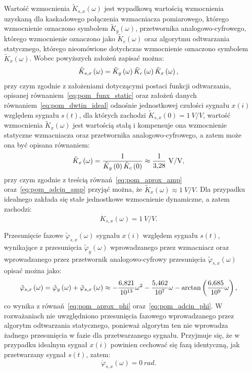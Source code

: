 Wartość wzmocnienia $\tilde{K}_{s,x}(\omega)$ jest wypadkową wartością wzmocnienia uzyskaną dla kaskadowego połączenia wzmacniacza pomiarowego, którego wzmocnienie oznaczono symbolem $\tilde{K}_{y}(\omega)$, przetwornika analogowo-cyfrowego, którego wzmocnienie oznaczono jako $\tilde{K}_{c}(\omega)$ oraz algorytmu odtwarzania statycznego, którego nieomówione dotychczas wzmocnienie oznaczono symbolem $\tilde{K}_{x}(\omega)$. Wobec powyższych założeń zapisać można:
\begin{equation}
\tilde{K}_{s,x} \left(\omega\right) = \tilde{K}_{y} \left(\omega\right) \tilde{K}_{c} \left(\omega\right) \tilde{K}_{x} \left(\omega\right) \label{eq:pom_dwtin_amp},
\end{equation}
przy czym zgodnie z założeniami dotyczącymi postaci funkcji odtwarzania, opisanej równaniem~\eqref{eq:pom_funx_static} oraz założeń danych równaniem~\eqref{eq:pom_dwtin_ideal} odnośnie jednostkowej czułości sygnału $x(i)$ względem sygnału $s(t)$, dla których zachodzi $\tilde{K}_{s,x}(0) = \qty{1}{V \per V}$, wartość wzmocnienia $\tilde{K}_{x}(\omega)$ jest wartością stałą i kompensuje ona wzmocnienie statyczne wzmacniacza oraz przetwornika analogowo-cyfrowego, a zatem może ona być opisana równaniem:
\begin{equation}
\tilde{K}_{x} \emb{\omega} = \frac{1}{\tilde{K}_{y} \emb{0} \tilde{K}_{c} \emb{0}} \approx \frac{1}{\num{3.28}}~\unit{V \per V} \label{eq:pom_dwtin_ampnorm},
\end{equation}
przy czym zgodnie z treścią równań~\eqref{eq:pom_aprox_amp} oraz~\eqref{eq:pom_adcin_amp} przyjąć można, że $\tilde{K}_{x}(\omega) \approx \qty{1}{V \per V}$. Dla przypadku idealnego zakłada się stałe jednostkowe wzmocnienie dynamiczne, a zatem zachodzi:
\begin{equation}
\dot{K}_{s,x}(\omega) = \qty{1}{V \per V} \label{eq:pom_dwtin_ampideal}.
\end{equation}

Przesunięcie fazowe $\tilde{\varphi}_{s,x}(\omega)$ sygnału $x(i)$ względem sygnału $s(t)$, wynikające z przesunięcia $\tilde{\varphi}_{y}(\omega)$ wprowadzanego przez wzmacniacz oraz wprowadzanego przez przetwornik analogowo-cyfrowy przesunięcia $\tilde{\varphi}_{s,x}(\omega)$ opisać można jako:
\begin{equation}
\tilde{\varphi}_{s,x} \left(\omega\right) = \tilde{\varphi}_{y} \left(\omega\right) + \tilde{\varphi}_{s,x} \left(\omega\right) \approx -\frac{\num{6.821}}{\num{e13}} \omega^{2} - \frac{\num{5.462}}{\num{e07}} \omega - \arctan \left(\frac{\num{6.685}}{\num{e9}} \omega\right) \label{eq:pom_dwtin_phi},
\end{equation}
co wynika z równań~\eqref{eq:pom_aprox_phi} oraz~\eqref{eq:pom_adcin_phi}. W rozważaniach nie uwzględniono przesunięcia fazowego wprowadzanego przez algorytm odtwarzania statycznego, ponieważ algorytm ten nie wprowadza żadnego przesunięcia w fazie dla przetwarzanego sygnału. Przyjmuje się, że w przypadku idealnym sygnał $x(i)$ powinien cechować się fazą identyczną, jak przetwarzany sygnał $s(t)$, zatem:
\begin{equation}
\dot{\varphi}_{s,x}(\omega) = \qty{0}{rad} \label{eq:pom_dwtin_phiideal}.
\end{equation}

